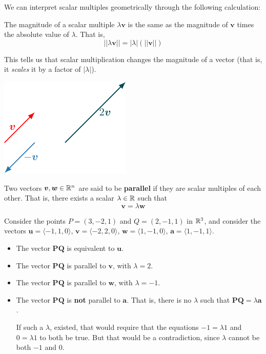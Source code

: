 We can interpret scalar multiples geometrically through the following calculation:

\begin{proposition}
  The magnitude of a scalar multiple $\lambda \bm{v}$ is the same as the magnitude of $\bm{v}$ times the absolute value of $\lambda$.  That is, $$||\lambda\bm{v}|| = |\lambda|(||\bm{v}||)$$
\end{proposition}

 \begin{example}
 This tells us that scalar multiplication changes the magnitude of a vector (that is, it \textit{scales} it by a factor of $|\lambda|$).  
 

 \begin{center}        
        \includegraphics{chapters/1-LinearAlgebra/figures/figures-scalarmultiples.pdf}
    \end{center}
    
    \end{example}


\begin{definition}
Two vectors $\bm{v}, \bm{w} \in \mathbb{R}^n$ are said to be \textbf{parallel} if they are scalar multiples of each other.  That is, there exists a scalar $\lambda \in \mathbb{R}$ such that $$\bm{v} = \lambda \bm{w}$$
\end{definition}

\begin{example}

    Consider the points $P = (3, -2, 1)$ and $Q = (2, -1, 1)$  in $\mathbb{R}^3$, and consider the vectors $\bm{u} = \langle -1, 1, 0 \rangle$, $\bm{v} = \langle -2, 2, 0 \rangle$, $\bm{w} = \langle 1, -1, 0 \rangle$,  $\bm{a} = \langle 1, -1, 1 \rangle$.
    
    \begin{itemize}
        \item The vector $\bm{PQ}$ is equivalent to $\bm{u}$.
        \item The vector $\bm{PQ}$ is parallel to $\bm{v}$, with $\lambda = 2$.
        \item The vector $\bm{PQ}$ is parallel to $\bm{w}$, with $\lambda = -1$.
        \item The vector $\bm{PQ}$ is \textbf{not} parallel to $\bm{a}$. That is, there is no $\lambda$ such that $\bm{PQ} = \lambda \bm{a}$.
        
        If such a $\lambda$, existed, that would require that the equations $-1 = \lambda 1$ and $0 = \lambda 1$ to both be true.  But that would be a contradiction, since $\lambda$ cannot be both $-1$ and $0$.
    \end{itemize}
    
\end{example}


